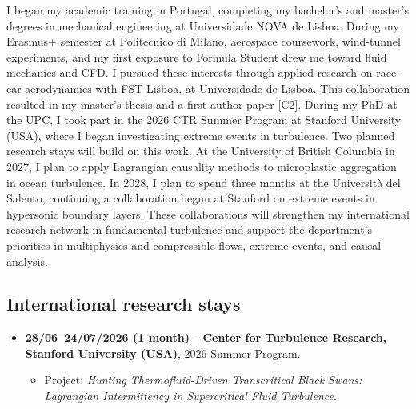 \documentclass[11pt]{article}
\newcommand{\NEW}[1]{\iffinal #1\else{\color{red}#1}\fi} %
\begin{document}
I began my academic training in Portugal, completing my bachelor's and master's degrees in mechanical engineering at Universidade NOVA de Lisboa. During my Erasmus+ semester at Politecnico di Milano, aerospace coursework, \NEW{wind-tunnel} experiments, and my first exposure to Formula Student drew me toward fluid mechanics and CFD. I pursued these interests through applied research on race-car aerodynamics with FST Lisboa, at Universidade de Lisboa. This collaboration resulted in my \href{http://hdl.handle.net/10362/149236}{master's thesis}
and a first-author paper [\hyperlink{pub-C2}{C2}].
During my PhD at the UPC, I took part in the 2026 CTR Summer Program at Stanford University (USA), where I began investigating extreme events in turbulence. Two planned research stays will build on this work. At the University of British Columbia in 2027, I plan to apply Lagrangian causality methods to microplastic aggregation in ocean turbulence. In 2028, I plan to spend three months at the Universit\`a del Salento, continuing a collaboration begun at Stanford on extreme events in hypersonic boundary layers. These collaborations will strengthen my international research network in fundamental turbulence and support the department's priorities in multiphysics and compressible flows, extreme events, and causal analysis.

\subsection{International research stays}\label{sec:stays}
\begin{itemize}
  \item \textbf{28/06--24/07/2026 (1 month)} -- \textbf{Center for Turbulence
  Research, Stanford University (USA)}, 2026 Summer Program. 
  \begin{itemize}
    \item Project: \emph{Hunting Thermofluid-Driven Transcritical Black Swans:
    Lagrangian Intermittency in Supercritical Fluid Turbulence}.
  \end{itemize}
\end{itemize}
\end{document}
